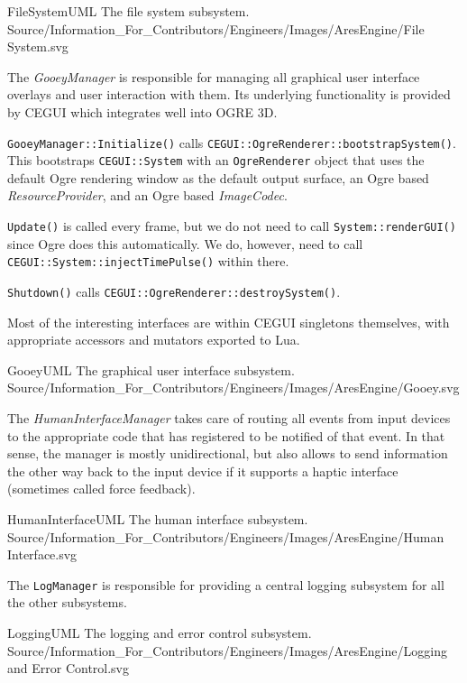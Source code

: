 \FullPageLandscapeDiagram
    {FileSystemUML}
    {The file system subsystem.}
    {Source/Information_For_Contributors/Engineers/Images/AresEngine/File System.svg}

\page 
{}
The {\it GooeyManager} is responsible for managing all graphical user interface overlays and user interaction with them. Its underlying functionality is provided by CEGUI which integrates well into OGRE 3D.

{\tt GooeyManager::Initialize()} calls {\tt CEGUI::OgreRenderer::bootstrapSystem()}. This bootstraps {\tt CEGUI::System} with an {\tt OgreRenderer} object that uses the default Ogre rendering window as the default output surface, an Ogre based {\it ResourceProvider}, and an Ogre based {\it ImageCodec}.

{\tt Update()} is called every frame, but we do not need to call {\tt System::renderGUI()} since Ogre does this automatically. We do, however, need to call {\tt CEGUI::System::injectTimePulse()} within there.

{\tt Shutdown()} calls {\tt CEGUI::OgreRenderer::destroySystem()}.

Most of the interesting interfaces are within CEGUI singletons themselves, with appropriate accessors and mutators exported to Lua.

\FullPageLandscapeDiagram
    {GooeyUML}
    {The graphical user interface subsystem.}
    {Source/Information_For_Contributors/Engineers/Images/AresEngine/Gooey.svg}

\page 
{}
The {\it HumanInterfaceManager} takes care of routing all events from input devices to the appropriate code that has registered to be notified of that event. In that sense, the manager is mostly unidirectional, but also allows to send information the other way back to the input device if it supports a haptic interface (sometimes called force feedback).

\FullPageLandscapeDiagram
    {HumanInterfaceUML}
    {The human interface subsystem.}
    {Source/Information_For_Contributors/Engineers/Images/AresEngine/Human Interface.svg}

\page 
{}
The {\tt LogManager} is responsible for providing a central logging subsystem for all the other subsystems.

\FullPageLandscapeDiagram
    {LoggingUML}
    {The logging and error control subsystem.}
    {Source/Information_For_Contributors/Engineers/Images/AresEngine/Logging and Error Control.svg}
    
